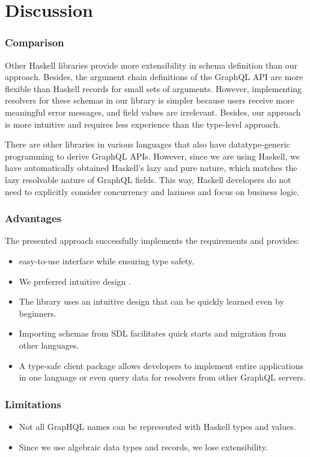 \section{Discussion}


\begin{frame}\frametitle{Comparison}

    Other Haskell libraries provide more extensibility in schema definition than our approach. Besides, the argument chain definitions of the GraphQL API are more flexible than Haskell records for small sets of arguments. However, implementing resolvers for these schemas in our library is simpler because users receive more meaningful error messages, and field values are irrelevant. Besides, our approach is more intuitive and requires less experience than the type-level approach.
    
    There are other libraries in various languages that also have datatype-generic programming to derive GraphQL APIs. However, since we are using Haskell, we have automatically obtained Haskell's lazy and pure nature, which matches the lazy resolvable nature of GraphQL fields. This way, Haskell developers do not need to explicitly consider concurrency and laziness and focus on business logic. 
\end{frame}
    
\begin{frame}\frametitle{Advantages}

The presented approach successfully implements the requirements and provides:

\begin{itemize}
    \item easy-to-use interface while ensuring type safety.
    \item We preferred intuitive design .
    \item The library uses an intuitive design that can be quickly learned even by beginners.
    \item Importing schemas from SDL facilitates quick starts and migration from other languages.
    \item A type-safe client package allows developers to implement entire applications in one language or even query data for resolvers from other GraphQL servers.
\end{itemize}

\end{frame}

\begin{frame}\frametitle{Limitations}

\begin{itemize}
    \item Not all GrapHQL names can be represented with Haskell types and values.
    \item Since we use algebraic data types and records, we lose extensibility.
\end{itemize}

\end{frame}

